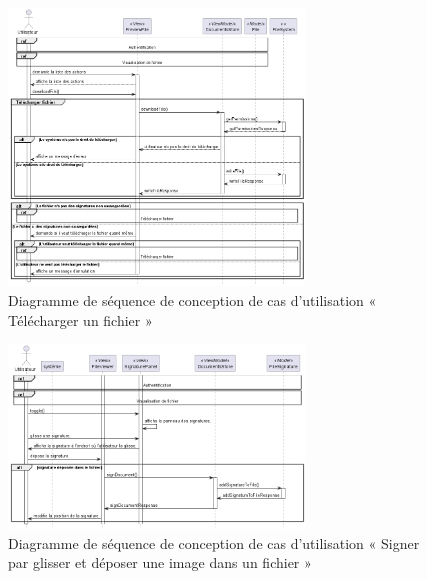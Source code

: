 \begin{figure}[H]
  \centering
  \includegraphics[width=0.7\textwidth]{out/diagrams/sprint4/sequence_download_file/sequence_download_file}
  \caption{Diagramme de séquence de conception de cas d'utilisation « Télécharger un fichier »}
  \label{fig:sequence_conception_download_file}
\end{figure}

\begin{figure}[H]
  \centering
  \includegraphics[width=0.7\textwidth]{out/diagrams/sprint4/sequence_sign_by_image/sequence_sign_by_image}
  \caption{Diagramme de séquence de conception de cas d'utilisation « Signer par glisser et déposer une image dans un fichier »}
  \label{fig:sequence_conception_sign_by_image}
\end{figure}

